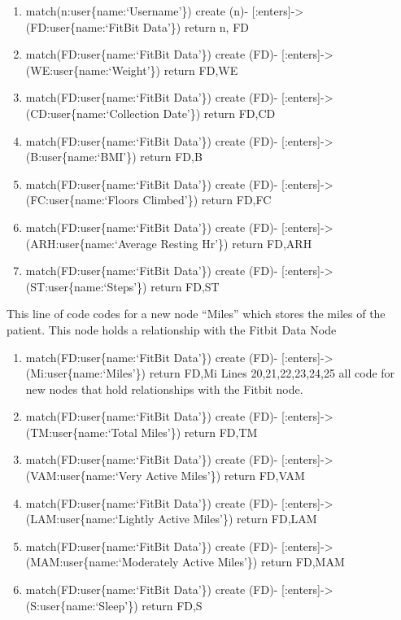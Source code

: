 \documentclass[]{book}
\providecommand{\tightlist}{%
  \setlength{\itemsep}{0pt}\setlength{\parskip}{0pt}}
\begin{document}
\begin{enumerate}
\def\labelenumi{\arabic{enumi}.}
\setcounter{enumi}{12}
\tightlist
\item
  match(n:user\{name:`Username'\}) create (n)- {[}:enters{]}-\textgreater{} (FD:user\{name:`FitBit Data'\}) return n, FD
\item
  match(FD:user\{name:`FitBit Data'\}) create (FD)- {[}:enters{]}-\textgreater{} (WE:user\{name:`Weight'\}) return FD,WE
\item
  match(FD:user\{name:`FitBit Data'\}) create (FD)- {[}:enters{]}-\textgreater{} (CD:user\{name:`Collection Date'\}) return FD,CD
\item
  match(FD:user\{name:`FitBit Data'\}) create (FD)- {[}:enters{]}-\textgreater{} (B:user\{name:`BMI'\}) return FD,B
\item
  match(FD:user\{name:`FitBit Data'\}) create (FD)- {[}:enters{]}-\textgreater{} (FC:user\{name:`Floors Climbed'\}) return FD,FC
\item
  match(FD:user\{name:`FitBit Data'\}) create (FD)- {[}:enters{]}-\textgreater{} (ARH:user\{name:`Average Resting Hr'\}) return FD,ARH
\item
  match(FD:user\{name:`FitBit Data'\}) create (FD)- {[}:enters{]}-\textgreater{} (ST:user\{name:`Steps'\}) return FD,ST
\end{enumerate}

This line of code codes for a new node ``Miles'' which stores the miles of the patient. This node holds a relationship with the Fitbit Data Node

\begin{enumerate}
\def\labelenumi{\arabic{enumi}.}
\setcounter{enumi}{19}
\tightlist
\item
  match(FD:user\{name:`FitBit Data'\}) create (FD)- {[}:enters{]}-\textgreater{} (Mi:user\{name:`Miles'\}) return FD,Mi
  Lines 20,21,22,23,24,25 all code for new nodes that hold relationships with the Fitbit node.
\item
  match(FD:user\{name:`FitBit Data'\}) create (FD)- {[}:enters{]}-\textgreater{} (TM:user\{name:`Total Miles'\}) return FD,TM
\item
  match(FD:user\{name:`FitBit Data'\}) create (FD)- {[}:enters{]}-\textgreater{} (VAM:user\{name:`Very Active Miles'\}) return FD,VAM
\item
  match(FD:user\{name:`FitBit Data'\}) create (FD)- {[}:enters{]}-\textgreater{} (LAM:user\{name:`Lightly Active Miles'\}) return FD,LAM
\item
  match(FD:user\{name:`FitBit Data'\}) create (FD)- {[}:enters{]}-\textgreater{} (MAM:user\{name:`Moderately Active Miles'\}) return FD,MAM
\item
  match(FD:user\{name:`FitBit Data'\}) create (FD)- {[}:enters{]}-\textgreater{} (S:user\{name:`Sleep'\}) return FD,S
\end{enumerate}
\end{document}
